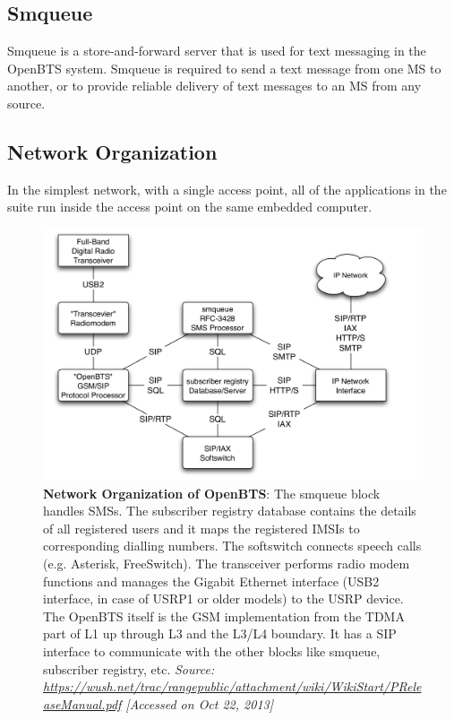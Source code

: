 \subsection{Smqueue}
Smqueue is a store-and-forward server that is used for text messaging in the OpenBTS system. Smqueue is required to send a text message from one MS to another, or to provide reliable delivery of text messages to an MS from any source.

\subsection{Network Organization}
In the simplest network, with a single access point, all of the applications in the suite run inside the access point on the same embedded computer.



\begin{figure}[h]
\centering
\includegraphics[width=1\textwidth]{networkOrg}
\caption[Network Organization of OpenBTS]{\textbf{Network Organization of OpenBTS}: The smqueue block handles SMSs.
The subscriber registry database contains the details of all registered users and it
maps the registered IMSIs to corresponding dialling numbers. The softswitch connects
speech calls (e.g. Asterisk, FreeSwitch). The transceiver performs radio modem
functions and manages the Gigabit Ethernet interface (USB2 interface, in case
of USRP1 or older models) to the USRP device. The OpenBTS itself is the GSM
implementation from the TDMA part of L1 up through L3 and the L3/L4 boundary.
It has a SIP interface to communicate with the other blocks like smqueue, subscriber
registry, etc. \emph{Source: \url{https://wush.net/trac/rangepublic/attachment/wiki/WikiStart/PReleaseManual.pdf} [Accessed on Oct 22, 2013]}
}
\label{networkOrg}
\end{figure}

